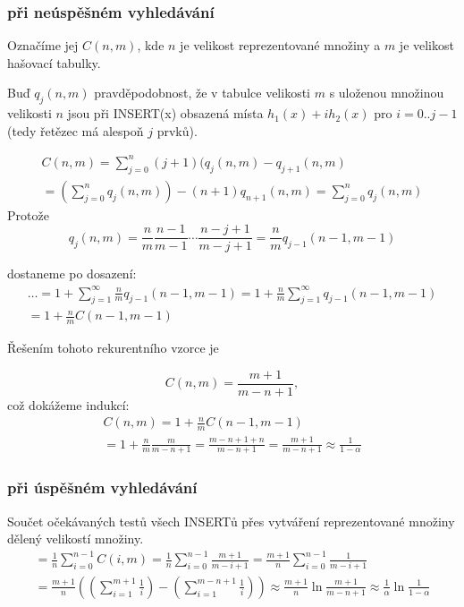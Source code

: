 \subsubsection{při neúspěšném vyhledávání}

Označíme jej $C(n,m)$, kde $n$ je velikost reprezentované množiny a
$m$ je velikost hašovací tabulky.

Buď $q_j(n,m)$ pravděpodobnost, že v tabulce velikosti $m$ s uloženou
množinou velikosti $n$ jsou při INSERT(x) obsazená místa
$h_1(x)+ih_2(x)$ pro $i=0..j-1$ (tedy řetězec má alespoň $j$ prvků).

\begin{multline}
C(n,m)	= \sum_{j=0}^n (j+1)(q_j(n,m) - q_{j+1}(n,m) \\
	=(\sum_{j=0}^n q_j(n,m) ) - (n+1) q_{n+1}(n,m)
	= \sum_{j=0}^n q_j(n,m)
\end{multline}
Protože
\begin{equation}
q_j(n,m) = \frac nm \frac{n-1}{m-1} \cdots \frac{n-j+1}{m-j+1}
	=  \frac nm q_{j-1}(n-1, m-1)
\end{equation}

dostaneme po dosazení:
\begin{multline}
\ldots	= 1 + \sum_{j=1}^\infty \frac nm q_{j-1}(n-1, m-1)
	= 1 + \frac nm \sum_{j=1}^\infty q_{j-1}(n-1, m-1) \\
	= 1 + \frac nm C(n-1, m-1)
\end{multline}

Řešením tohoto rekurentního vzorce je

\begin{equation}
C(n,m) = \frac{m+1}{m-n+1}, 
\end{equation}
což dokážeme indukcí:
\begin{multline}
C(n,m)	= 1 + \frac nm C(n-1, m-1) \\
	= 1 + \frac nm \frac{m}{m-n+1} = \frac{m-n+1+n}{m-n+1} 
	= \frac{m+1}{m-n+1}
\approx   \frac 1{1-\alpha}
\end{multline}

\subsubsection{při úspěšném vyhledávání}

Součet očekávaných testů všech INSERTů přes vytváření reprezentované
množiny dělený velikostí množiny.
\begin{multline}
= \frac 1n	\sum_{i=0}^{n-1} C(i, m)
= \frac 1n	\sum_{i=0}^{n-1} \frac{m+1}{m-i+1}
= \frac {m+1}n	\sum_{i=0}^{n-1} \frac    1{m-i+1} \\
= \frac {m+1}n
	((\sum_{i=1}^{m+1} \frac 1i) - (\sum_{i=1}^{m-n+1} \frac 1i))
\approx \frac {m+1}n \ln \frac{m+1}{m-n+1}
\approx \frac 1\alpha \ln \frac 1{1-\alpha}
\end{multline}

